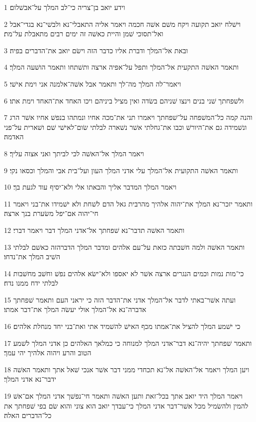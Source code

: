 \par 1 וידע יואב בן־צריה כי־לב המלך על־אבשׁלום׃
\par 2 וישׁלח יואב תקועה ויקח משׁם אשׁה חכמה ויאמר אליה התאבלי־נא ולבשׁי־נא בגדי־אבל ואל־תסוכי שׁמן והיית כאשׁה זה ימים רבים מתאבלת על־מת׃
\par 3 ובאת אל־המלך ודברת אליו כדבר הזה וישׂם יואב את־הדברים בפיה׃
\par 4 ותאמר האשׁה התקעית אל־המלך ותפל על־אפיה ארצה ותשׁתחו ותאמר הושׁעה המלך׃
\par 5 ויאמר־לה המלך מה־לך ותאמר אבל אשׁה־אלמנה אני וימת אישׁי׃
\par 6 ולשׁפחתך שׁני בנים וינצו שׁניהם בשׂדה ואין מציל ביניהם ויכו האחד את־האחד וימת אתו׃
\par 7 והנה קמה כל־המשׁפחה על־שׁפחתך ויאמרו תני את־מכה אחיו ונמתהו בנפשׁ אחיו אשׁר הרג ונשׁמידה גם את־היורשׁ וכבו את־גחלתי אשׁר נשׁארה לבלתי שׂום־לאישׁי שׁם ושׁארית על־פני האדמה׃
\par 8 ויאמר המלך אל־האשׁה לכי לביתך ואני אצוה עליך׃
\par 9 ותאמר האשׁה התקועית אל־המלך עלי אדני המלך העון ועל־בית אבי והמלך וכסאו נקי׃
\par 10 ויאמר המלך המדבר אליך והבאתו אלי ולא־יסיף עוד לגעת בך׃
\par 11 ותאמר יזכר־נא המלך את־יהוה אלהיך מהרבית גאל הדם לשׁחת ולא ישׁמידו את־בני ויאמר חי־יהוה אם־יפל משׂערת בנך ארצה׃
\par 12 ותאמר האשׁה תדבר־נא שׁפחתך אל־אדני המלך דבר ויאמר דברי׃
\par 13 ותאמר האשׁה ולמה חשׁבתה כזאת על־עם אלהים ומדבר המלך הדברהזה כאשׁם לבלתי השׁיב המלך את־נדחו׃
\par 14 כי־מות נמות וכמים הנגרים ארצה אשׁר לא יאספו ולא־ישׂא אלהים נפשׁ וחשׁב מחשׁבות לבלתי ידח ממנו נדח׃
\par 15 ועתה אשׁר־באתי לדבר אל־המלך אדני את־הדבר הזה כי יראני העם ותאמר שׁפחתך אדברה־נא אל־המלך אולי יעשׂה המלך את־דבר אמתו׃
\par 16 כי ישׁמע המלך להציל את־אמתו מכף האישׁ להשׁמיד אתי ואת־בני יחד מנחלת אלהים׃
\par 17 ותאמר שׁפחתך יהיה־נא דבר־אדני המלך למנוחה כי כמלאך האלהים כן אדני המלך לשׁמע הטוב והרע ויהוה אלהיך יהי עמך׃
\par 18 ויען המלך ויאמר אל־האשׁה אל־נא תכחדי ממני דבר אשׁר אנכי שׁאל אתך ותאמר האשׁה ידבר־נא אדני המלך׃
\par 19 ויאמר המלך היד יואב אתך בכל־זאת ותען האשׁה ותאמר חי־נפשׁך אדני המלך אם־אשׁ להמין ולהשׂמיל מכל אשׁר־דבר אדני המלך כי־עבדך יואב הוא צוני והוא שׂם בפי שׁפחתך את כל־הדברים האלה׃
